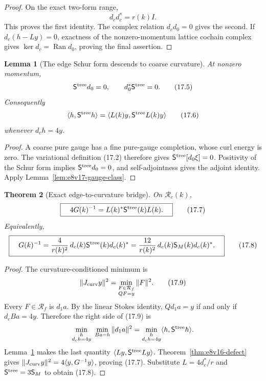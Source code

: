 \documentclass[11pt,oneside]{book}
\newtheorem{theorem}{Theorem}[chapter]
\newtheorem{lemma}[theorem]{Lemma}
\theoremstyle{definition}
\theoremstyle{remark}
\begin{document}
\begin{proof}
On the exact two-form range,
\[
 d_cd_c^*=r(k)I.
\]
This proves the first identity.  The complex relation
\(d_cd_0=0\) gives the second.  If \(d_c(h-Ly)=0\), exactness of the
nonzero-momentum lattice cochain complex gives
\(\ker d_c=\operatorname{Ran}d_0\), proving the final assertion.
\end{proof}

\begin{lemma}[The edge Schur form descends to coarse curvature]
\label{lem:e8v17-ward}
At nonzero momentum,
\[
 \mathsf S^{\rm tree}d_0=0,\qquad
 d_0^*\mathsf S^{\rm tree}=0.                       \tag{17.5}
\]
Consequently
\[
 \langle h,\mathsf S^{\rm tree}h\rangle
 =\langle L(k)y,\mathsf S^{\rm tree}L(k)y\rangle    \tag{17.6}
\]
whenever \(d_ch=4y\).
\end{lemma}

\begin{proof}
A coarse pure gauge has a fine pure-gauge completion, whose curl
energy is zero.  The variational definition (17.2) therefore gives
\(\mathsf S^{\rm tree}[d_0\xi]=0\).  Positivity of the Schur form
implies \(\mathsf S^{\rm tree}d_0=0\), and self-adjointness gives the
adjoint identity.  Apply Lemma~\ref{lem:e8v17-gauge-class}.
\end{proof}

\begin{theorem}[Exact edge-to-curvature bridge]
\label{thm:e8v17-bridge}
On \(\mathcal R_c(k)\),
\[
\boxed{\quad
 4G(k)^{-1}
 =L(k)^*\mathsf S^{\rm tree}(k)L(k).
\quad}                                             \tag{17.7}
\]
Equivalently,
\[
\boxed{\quad
 G(k)^{-1}
 =\frac4{r(k)^2}\,
 d_c(k)\mathsf S^{\rm tree}(k)d_c(k)^*
 =\frac{12}{r(k)^2}\,
 d_c(k)\mathsf S_M(k)d_c(k)^*.
\quad}                                             \tag{17.8}
\]
\end{theorem}

\begin{proof}
The curvature-conditioned minimum is
\[
 \|J_{\rm curv}y\|^2
 =\min_{\substack{F\in\mathcal R_f\\QF=y}}\|F\|^2. \tag{17.9}
\]
Every \(F\in\mathcal R_f\) is \(d_1a\).  By the linear Stokes identity,
\(Qd_1a=y\) if and only if \(d_cBa=4y\).  Therefore the right side of
(17.9) is
\[
 \min_{\substack{h\\d_ch=4y}}\ \min_{Ba=h}\|d_1a\|^2
 =\min_{\substack{h\\d_ch=4y}}
       \langle h,\mathsf S^{\rm tree}h\rangle.
\]
Lemma~\ref{lem:e8v17-ward} makes the last quantity
\(\langle Ly,\mathsf S^{\rm tree}Ly\rangle\).
Theorem~\ref{thm:e8v16-defect} gives
\(\|J_{\rm curv}y\|^2=4\langle y,G^{-1}y\rangle\),
proving (17.7).  Substitute \(L=4d_c^*/r\) and
\(\mathsf S^{\rm tree}=3\mathsf S_M\) to obtain (17.8).
\end{proof}
\end{document}
